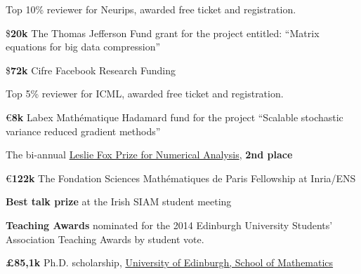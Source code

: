 \begin{bibsection}
\item[2020] Top 10\% reviewer for Neurips, awarded free ticket and registration.
\item[2019] \${\bf 20k}  The Thomas Jefferson Fund grant for the project entitled: ``Matrix equations for big data compression''
\item \${\bf 72k}   Cifre Facebook Research Funding 
 \item Top 5\% reviewer for ICML, awarded free ticket and registration.
\item[2018 ] \euro {\bf 8k}   Labex Mathématique Hadamard fund for the project ``Scalable stochastic variance reduced gradient methods''%
	\item[2017] The bi-annual \href{http://people.maths.ox.ac.uk/wathen/fox/}{Leslie Fox Prize for Numerical Analysis}, {\bf 2nd place} 
\item[2016 ] \euro {\bf 122k}  The Fondation Sciences Math\'ematiques de Paris Fellowship at Inria/ENS
	\item[2014] {\bf Best talk prize} at the Irish SIAM student meeting
	\item {\bf Teaching Awards} nominated for the 2014 Edinburgh University Students' Association Teaching Awards by student vote.
\item[2012 ] {\bf  \pounds 85,1k}  Ph.D. scholarship, \href{http://research.ie/funding/postgraduate-funding}{University of Edinburgh, School of Mathematics}
%

\end{bibsection}
